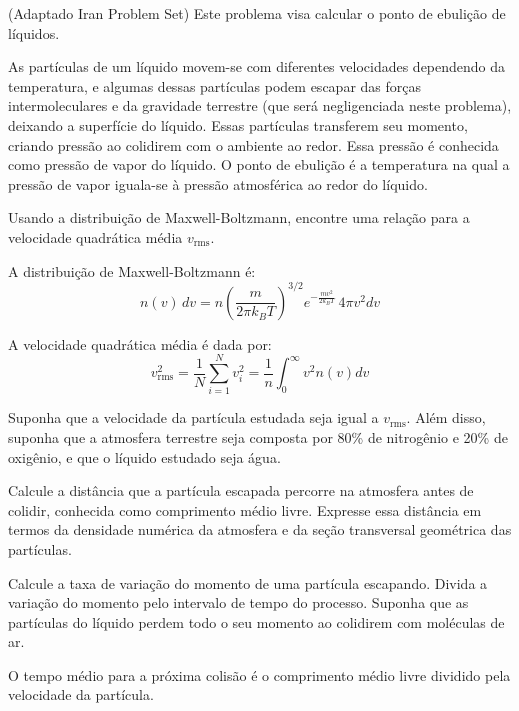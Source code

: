 \documentclass[11pt]{article}
\begin{document}
\begin{pproblem} (Adaptado Iran Problem Set)
    Este problema visa calcular o ponto de ebulição de líquidos. 

As partículas de um líquido movem-se com diferentes velocidades dependendo da temperatura, e algumas dessas partículas podem escapar das forças intermoleculares e da gravidade terrestre (que será negligenciada neste problema), deixando a superfície do líquido. Essas partículas transferem seu momento, criando pressão ao colidirem com o ambiente ao redor. Essa pressão é conhecida como pressão de vapor do líquido. O ponto de ebulição é a temperatura na qual a pressão de vapor iguala-se à pressão atmosférica ao redor do líquido.

\begin{alternativas}
\item Usando a distribuição de Maxwell-Boltzmann, encontre uma relação para a velocidade quadrática média $v_{\text{rms}}$.

A distribuição de Maxwell-Boltzmann é:
\begin{equation}
    n(v) \, dv = n \left(\frac{m}{2\pi k_B T}\right)^{3/2} e^{-\frac{mv^2}{2k_BT}} \, 4\pi v^2 dv
\end{equation}

A velocidade quadrática média é dada por:
\begin{equation}
    v_{\text{rms}}^2 = \frac{1}{N} \sum_{i=1}^N v_i^2 = \frac{1}{n} \int_0^\infty v^2 n(v) dv
\end{equation}

\item Suponha que a velocidade da partícula estudada seja igual a $v_{\text{rms}}$. Além disso, suponha que a atmosfera terrestre seja composta por 80\% de nitrogênio e 20\% de oxigênio, e que o líquido estudado seja água.

Calcule a distância que a partícula escapada percorre na atmosfera antes de colidir, conhecida como comprimento médio livre. Expresse essa distância em termos da densidade numérica da atmosfera e da seção transversal geométrica das partículas.

\item Calcule a taxa de variação do momento de uma partícula escapando. Divida a variação do momento pelo intervalo de tempo do processo. Suponha que as partículas do líquido perdem todo o seu momento ao colidirem com moléculas de ar.

O tempo médio para a próxima colisão é o comprimento médio livre dividido pela velocidade da partícula.


\end{alternativas}
\end{pproblem}
\end{document}
